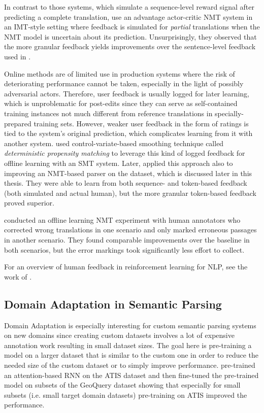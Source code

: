 In contrast to those systems, which simulate a sequence-level reward signal
after predicting a complete translation, \textcite{lam-2018} use an advantage
actor-critic NMT system in an IMT-style setting where feedback is simulated for
\emph{partial} translations when the NMT model is uncertain about its
prediction. Unsurprisingly, they observed that the more granular feedback yields
improvements over the sentence-level feedback used in \textcite{nguyen-2017}.

Online methods are of limited use in production systems where the risk of
deteriorating performance cannot be taken, especially in the light of possibly
adversarial actors. Therefore, user feedback is usually logged for later
learning, which is unproblematic for post-edits since they can serve as
self-contained training instances not much different from reference translations
in specially-prepared training sets. However, weaker user feedback in the form
of ratings is tied to the system’s original prediction, which complicates
learning from it with another system. \textcite{lawrence-2017} used
control-variate-based smoothing technique called \emph{deterministic propensity
  matching} to leverage this kind of logged feedback for offline learning with
an SMT system. Later, \textcite{lawrence-2018} applied this approach also to
improving an NMT-based parser on the \nlmapstwo{} dataset, which is discussed
later in this thesis. They were able to learn from both sequence- and
token-based feedback (both simulated and actual human), but the more granular
token-based feedback proved superior.

\textcite{kreutzer-2020a} conducted an offline learning NMT experiment with
human annotators who corrected wrong translations in one scenario and only
marked erroneous passages in another scenario. They found comparable
improvements over the baseline in both scenarios, but the error markings took
significantly less effort to collect.

For an overview of human feedback in reinforcement learning for NLP, see the
work of \textcite{kreutzer-2020b}.

\subsection{Domain Adaptation in Semantic Parsing}

Domain Adaptation is especially interesting for custom semantic parsing systems
on new domains since creating custom datasets involves a lot of expensive
annotation work resulting in small dataset sizes. The goal here is pre-training
a model on a larger dataset that is similar to the custom one in order to reduce
the needed size of the custom dataset or to simply improve performance.
\textcite{kennardi-2019} pre-trained an attention-based RNN on the ATIS dataset
and then fine-tuned the pre-trained model on subsets of the GeoQuery dataset
showing that especially for small subsets (i.e. small target domain datasets)
pre-training on ATIS improved the performance.

